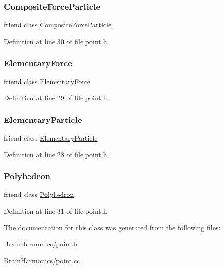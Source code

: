 \subsubsection{\texorpdfstring{Composite\+Force\+Particle}{CompositeForceParticle}}
{\footnotesize\ttfamily friend class \hyperlink{class_composite_force_particle}{Composite\+Force\+Particle}\hspace{0.3cm}{\ttfamily [friend]}}



Definition at line 30 of file point.\+h.

\mbox{\label{class_point_a6e57500586e9cd366f5cf76ea0299957}} 
\subsubsection{\texorpdfstring{Elementary\+Force}{ElementaryForce}}
{\footnotesize\ttfamily friend class \hyperlink{class_elementary_force}{Elementary\+Force}\hspace{0.3cm}{\ttfamily [friend]}}



Definition at line 29 of file point.\+h.

\mbox{\label{class_point_af2ace341c1d7ccd30de3502502773591}} 
\subsubsection{\texorpdfstring{Elementary\+Particle}{ElementaryParticle}}
{\footnotesize\ttfamily friend class \hyperlink{class_elementary_particle}{Elementary\+Particle}\hspace{0.3cm}{\ttfamily [friend]}}



Definition at line 28 of file point.\+h.

\mbox{\label{class_point_a28d1b9582890ca3e2b61dafdc1c3ba84}} 
\subsubsection{\texorpdfstring{Polyhedron}{Polyhedron}}
{\footnotesize\ttfamily friend class \hyperlink{class_polyhedron}{Polyhedron}\hspace{0.3cm}{\ttfamily [friend]}}



Definition at line 31 of file point.\+h.



The documentation for this class was generated from the following files\+:\begin{DoxyCompactItemize}
\item 
Brain\+Harmonics/\hyperlink{point_8h}{point.\+h}\item 
Brain\+Harmonics/\hyperlink{point_8cc}{point.\+cc}\end{DoxyCompactItemize}
